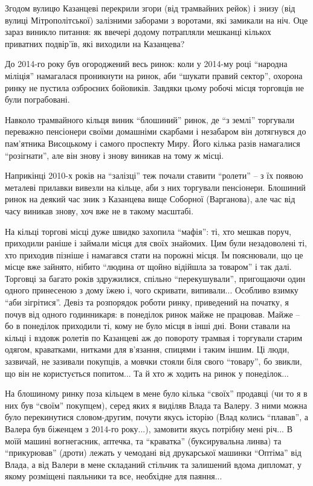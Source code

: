 Згодом вулицю Казанцеві перекрили згори (від трамвайних рейок) і знизу (від
вулиці Мітрополітської) залізними заборами з воротами, які замикали на ніч.
Оце зараз виникло питання: як ввечері додому потрапляли мешканці кількох
приватних подвір'їв, які виходили на Казанцева?

До 2014-го року був огороджений весь ринок: коли у 2014-му році \enquote{народна
міліція} намагалася проникнути на ринок, аби \enquote{шукати правий сектор}, охорона
ринку не пустила озброєних бойовиків. Завдяки цьому робочі місця торговців
не були пограбовані.

Навколо трамвайного кільця виник \enquote{блошиний} ринок, де \enquote{з землі} торгували
переважно пенсіонери своїми домашніми скарбами і незабаром він дотягнувся до
пам'ятника Висоцькому і самого проспекту Миру. Його кілька разів намагалися
\enquote{розігнати}, але він знову і знову виникав на тому ж місці. 

Наприкінці 2010-х років на \enquote{залізці} теж почали ставити \enquote{ролети} – з їх
появою металеві прилавки вивезли на кільце, аби з них торгували пенсіонери.
Блошиний ринок на деякий час зник з Казанцева вище Соборної (Варганова), але
час від часу виникав знову, хоч вже не в такому масштабі.

На кільці торгові місці дуже швидко захопила \enquote{мафія}: ті, хто мешкав поруч,
приходили раніше і займали місця для своїх знайомих. Цим були незадоволені ті,
хто приходив пізніше і намагався стати на порожні місця. Їм пояснювали, що це
місце вже зайнято, нібито \enquote{людина от щойно відійшла за товаром} і так далі.
Торговці за багато років здружилися, спільно \enquote{перекушували}, пригощаючи один
одного принесеною з дому їжею і, чого скривати, випивали... Особливо взимку
\enquote{аби зігрітися}. Девіз та розпорядок роботи ринку, приведений на початку, я
почув від одного годинникаря: в понеділок ринок майже не працював. Майже – бо в
понеділок приходили ті, кому не було місця в інші дні. Вони ставали на кільці і
вздовж ролетів по Казанцеві аж до повороту трамвая і торгували старим одягом,
краватками, нитками для в’язання, спицями і таким іншим. Ці люди, зазвичай, не
зазивали покупців, а мовчки стояли біля свого \enquote{товару}, бо звикли, що він не
користується попитом... Та й хто ж ходить на ринок у понеділок...

На блошиному ринку поза кільцем в мене було кілька \enquote{своїх} продавці (чи то я в
них був \enquote{своїм} покупцем), серед яких я виділяв Влада та Валеру. З ними можна
було перекинутися словом-другим, почути якусь історію (Влад колись \enquote{плавав}, а
Валера був біженцем з 2014-го року...), замовити якусь потрібну мені річ... В
моїй машині вогнегасник, аптечка, та \enquote{краватка} (буксирувальна линва) та 
\enquote{прикурював} (дроти) лежать у чемодані від друкарської машинки \enquote{Оптіма} від
Влада, а від Валери в мене складаний стільчик та залишений вдома дипломат, у
якому розміщені паяльники та все, необхідне для паяння...

